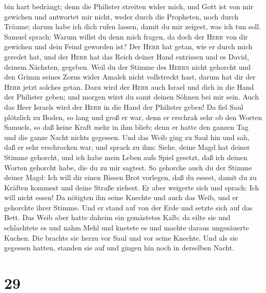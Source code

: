 bin hart bedrängt; denn die Philister streiten wider mich, und Gott ist
von mir gewichen und antwortet mir nicht, weder durch die Propheten,
noch durch Träume; darum habe ich dich rufen lassen, damit du mir
zeigest, was ich tun soll.  Samuel sprach: Warum willst
du denn mich fragen, da doch der \textsc{Herr} von dir gewichen und dein
Feind geworden ist?  Der \textsc{Herr} hat getan, wie er
durch mich geredet hat, und der \textsc{Herr} hat das Reich deiner Hand
entrissen und es David, deinem Nächsten, gegeben.  Weil
du der Stimme des \textsc{Herrn} nicht gehorcht und den Grimm seines
Zorns wider Amalek nicht vollstreckt hast, darum hat dir der
\textsc{Herr} jetzt solches getan.  Dazu wird der
\textsc{Herr} auch Israel und dich in die Hand der Philister geben; und
morgen wirst du samt deinen Söhnen bei mir sein. Auch das Heer Israels
wird der \textsc{Herr} in die Hand der Philister geben! 
Da fiel Saul plötzlich zu Boden, so lang und groß er war, denn er
erschrak sehr ob den Worten Samuels, so daß keine Kraft mehr in ihm
blieb; denn er hatte den ganzen Tag und die ganze Nacht nichts gegessen.
 Und das Weib ging zu Saul hin und sah, daß er sehr
erschrocken war, und sprach zu ihm: Siehe, deine Magd hat deiner Stimme
gehorcht, und ich habe mein Leben aufs Spiel gesetzt, daß ich deinen
Worten gehorcht habe, die du zu mir sagtest.  So gehorche
auch du der Stimme deiner Magd: Ich will dir einen Bissen Brot vorlegen,
daß du essest, damit du zu Kräften kommest und deine Straße ziehest.
 Er aber weigerte sich und sprach: Ich will nicht essen!
Da nötigten ihn seine Knechte und auch das Weib, und er gehorchte ihrer
Stimme. Und er stand auf von der Erde und setzte sich auf das Bett.
 Das Weib aber hatte daheim ein gemästetes Kalb; da eilte
sie und schlachtete es und nahm Mehl und knetete es und machte daraus
ungesäuerte Kuchen.  Die brachte sie herzu vor Saul und
vor seine Knechte. Und als sie gegessen hatten, standen sie auf und
gingen hin noch in derselben Nacht.

\hypertarget{section-28}{%
\section{29}\label{section-28}}

